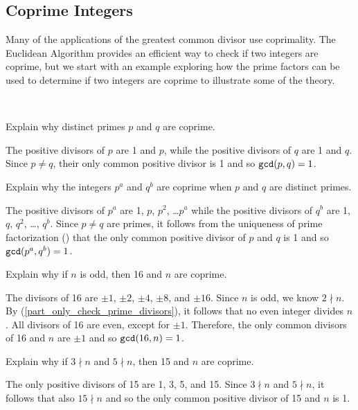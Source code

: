 \newcommand{\subcoprime}{Coprime Integers}
\subsection{\subcoprime}
\label{sub_coprime}

Many of the applications of the greatest common divisor use coprimality. The Euclidean Algorithm provides an efficient way to check if two integers are coprime, but we start with an example exploring how the prime factors can be used to determine if two integers are coprime to illustrate some of the theory.

\begin{exam}
\label{exam_coprime}
~
    \begin{apart}
        \item Explain why distinct primes $p$ and $q$ are coprime.
            \begin{soln}
                The positive divisors of $p$ are 1 and $p$, while the positive divisors of $q$ are 1 and $q$.  Since $p \neq q$, their only common positive divisor is 1 and so $\texttt{gcd}(p,q)=1$.
            \end{soln}
        \item Explain why the integers $p^a$ and $q^b$ are coprime when $p$ and $q$ are distinct primes.
            \begin{soln}
                The positive divisors of $p^a$ are 1, $p$, $p^2$, \ldots $p^a$ while the positive divisors of $q^b$ are 1, $q$, $q^2$, \ldots, $q^b$.  Since $p \neq q$ are primes, it follows from the uniqueness of prime factorization () that the only common positive divisor of $p$ and $q$ is 1 and so $\texttt{gcd}(p^a,q^b)=1$.
            \end{soln}
        \item Explain why if $n$ is odd, then 16 and $n$ are coprime.
            \begin{soln}
                The divisors of 16 are $\pm1$, $\pm2$, $\pm4$, $\pm8$, and $\pm16$.  Since $n$ is odd, we know $2 \nmid n$. By  (\ref{part_only_check_prime_divisors}), it follows that no even integer divides $n$.  All divisors of 16 are even, except for $\pm1$. Therefore, the only common divisors of 16 and $n$ are $\pm1$ and so $\texttt{gcd}(16,n)=1$.
            \end{soln}
        \item \label{part_coprime15} Explain why if $3 \nmid n$ and $5 \nmid n$, then 15 and $n$ are coprime.
            \begin{soln}
                The only positive divisors of 15 are 1, 3, 5, and 15.  Since $3 \nmid n$ and $5 \nmid n$, it follows that also $15 \nmid n$ and so the only common positive divisor of 15 and $n$ is 1.
            \end{soln}
    \end{apart}
\end{exam}

